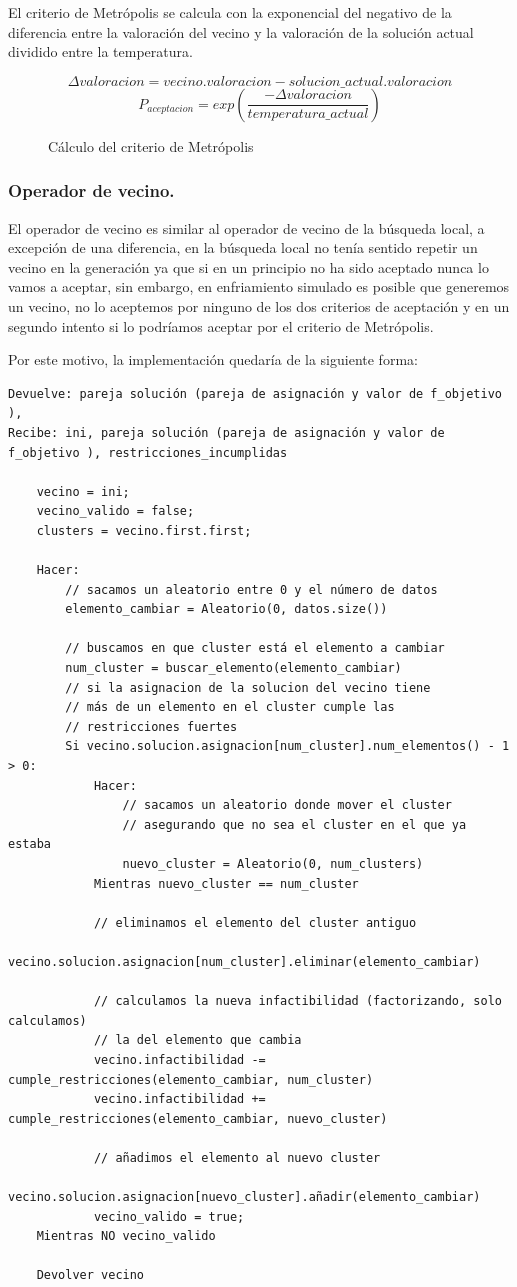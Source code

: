 \documentclass[12pt, spanish]{article}
\begin{document}
El criterio de Metrópolis se calcula con la exponencial del negativo de la diferencia entre la valoración del vecino y la valoración de la solución actual dividido entre la temperatura.

\begin{figure}[H]
	\centering
	$$ \Delta valoracion = vecino.valoracion - solucion\_actual.valoracion $$
	$$ P_{aceptacion} = exp(\frac{- \Delta valoracion}{temperatura\_actual}) $$
	\caption{Cálculo del criterio de Metrópolis }
	\label{cMetropolis}
\end{figure}


\subsubsection{Operador de vecino.}

El operador de vecino es similar al operador de vecino de la búsqueda local, a excepción de una diferencia, en la búsqueda local no tenía sentido repetir un vecino en la generación ya que si en un principio no ha sido aceptado nunca lo vamos a aceptar, sin embargo, en enfriamiento simulado es posible que generemos un vecino, no lo aceptemos por ninguno de los dos criterios de aceptación y en un segundo intento si lo podríamos aceptar por el criterio de Metrópolis.

Por este motivo, la implementación quedaría de la siguiente forma:

\begin{lstlisting}
Devuelve: pareja solución (pareja de asignación y valor de f_objetivo ), 
Recibe: ini, pareja solución (pareja de asignación y valor de f_objetivo ), restricciones_incumplidas

	vecino = ini;
	vecino_valido = false;
	clusters = vecino.first.first;
	
	Hacer:
		// sacamos un aleatorio entre 0 y el número de datos
		elemento_cambiar = Aleatorio(0, datos.size())
	
		// buscamos en que cluster está el elemento a cambiar
		num_cluster = buscar_elemento(elemento_cambiar)
		// si la asignacion de la solucion del vecino tiene 
		// más de un elemento en el cluster cumple las
		// restricciones fuertes
		Si vecino.solucion.asignacion[num_cluster].num_elementos() - 1 > 0:
			Hacer:
				// sacamos un aleatorio donde mover el cluster
				// asegurando que no sea el cluster en el que ya estaba
				nuevo_cluster = Aleatorio(0, num_clusters)
			Mientras nuevo_cluster == num_cluster
			
			// eliminamos el elemento del cluster antiguo
			vecino.solucion.asignacion[num_cluster].eliminar(elemento_cambiar)
			
			// calculamos la nueva infactibilidad (factorizando, solo calculamos)
			// la del elemento que cambia
			vecino.infactibilidad -= cumple_restricciones(elemento_cambiar, num_cluster)
			vecino.infactibilidad += cumple_restricciones(elemento_cambiar, nuevo_cluster)
			
			// añadimos el elemento al nuevo cluster
			vecino.solucion.asignacion[nuevo_cluster].añadir(elemento_cambiar)
			vecino_valido = true;	
	Mientras NO vecino_valido
	
	Devolver vecino
\end{lstlisting}
\end{document}
